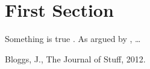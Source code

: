 \documentclass[11pt]{article}
\begin{document}
\section{First Section}

Something is true \citep{bloggs:2012}. As argued by \citet{bloggs:2012}, \dots

\begin{thebibliography}{99}

 Bloggs, J., The Journal of Stuff, 2012.

\end{thebibliography}
\end{document}

